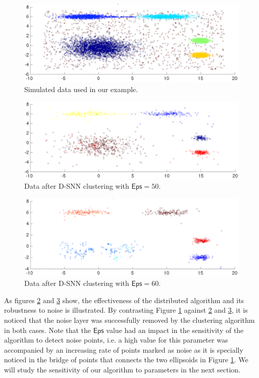 \documentclass[smallextended]{svjour3}       %
\begin{document}
\begin{figure}[!htbp]
\centering
  \includegraphics[scale=0.47]{toy_example_original.pdf}
  \caption{Simulated data used in our example.}
  \label{fig:toy_original}
\end{figure}

\begin{figure}[!htbp]
\centering
  \includegraphics[scale=0.54]{toy_example_after_Dsnn_2.pdf}
  \caption{Data after D-SNN clustering with $\mathsf{Eps}=50$.}
  \label{fig:toy_dsnn1}
\end{figure}

\begin{figure}[!htbp]
\centering
  \includegraphics[scale=0.54]{toy_example_after_Dsnn_1.pdf}
  \caption{Data after D-SNN clustering with $\mathsf{Eps}=60$.}
  \label{fig:toy_dsnn2}
\end{figure}

As figures \ref{fig:toy_dsnn1} and \ref{fig:toy_dsnn2} show, the effectiveness of the distributed algorithm and its robustness to noise is illustrated. 
By contrasting Figure \ref{fig:toy_original} against \ref{fig:toy_dsnn1} and \ref{fig:toy_dsnn2}, it is noticed that the noise layer was successfully removed by the clustering algorithm in both cases. Note that the $\mathsf{Eps}$ value had an impact in the sensitivity of the algorithm to detect noise points, i.e. a high value for this parameter was accompanied by an increasing rate of points marked as noise as it is specially noticed in the bridge of points that connects the two ellipsoids in Figure \ref{fig:toy_original}. We will study the sensitivity of our algorithm to parameters in the next section. 
\end{document}
